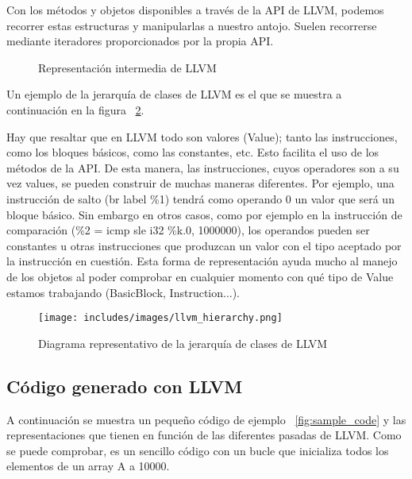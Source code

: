 Con los métodos y objetos disponibles a través de la API de LLVM, podemos recorrer estas estructuras y manipularlas a nuestro antojo. Suelen recorrerse mediante iteradores proporcionados por la propia API. 

\begin{figure}[tph]
\begin{center}
\caption{Representación intermedia de LLVM}
\label{fig:module}
\end{center}
\end{figure}
%

Un ejemplo de la jerarquía de clases de LLVM es el que se muestra a continuación en la figura   ~\ref{fig:llvm_hierarchy}.

Hay que resaltar que en LLVM todo son valores (Value); tanto las instrucciones, como los bloques básicos, como las constantes, etc. Esto facilita el uso de los métodos de la API. De esta manera, las instrucciones, cuyos operadores son a su vez values, se pueden construir de muchas maneras diferentes. Por ejemplo, una instrucción de salto (br label \%1) tendrá como operando 0 un valor que será un bloque básico. Sin embargo en otros casos, como por ejemplo en la instrucción de comparación (\%2 = icmp sle i32 \%k.0, 1000000), los operandos pueden ser constantes u otras instrucciones que produzcan un valor con el tipo aceptado por la instrucción en cuestión. 
Esta forma de representación ayuda mucho al manejo de los objetos al poder comprobar en cualquier momento con qué tipo de Value estamos trabajando (BasicBlock, Instruction...).

%
\begin{figure}[t]
\begin{center}
\texttt{[image: includes/images/llvm\_hierarchy.png]}
\caption{Diagrama representativo de la jerarquía de clases de LLVM}
\label{fig:llvm_hierarchy}
\end{center}
\end{figure}
%

\subsection{Código generado con LLVM}

A continuación se muestra un pequeño código de ejemplo ~\ref{fig:sample_code} y las representaciones que tienen en función de las diferentes pasadas de LLVM. Como se puede comprobar, es un sencillo código con un bucle que inicializa todos los elementos de un array A a 10000.


